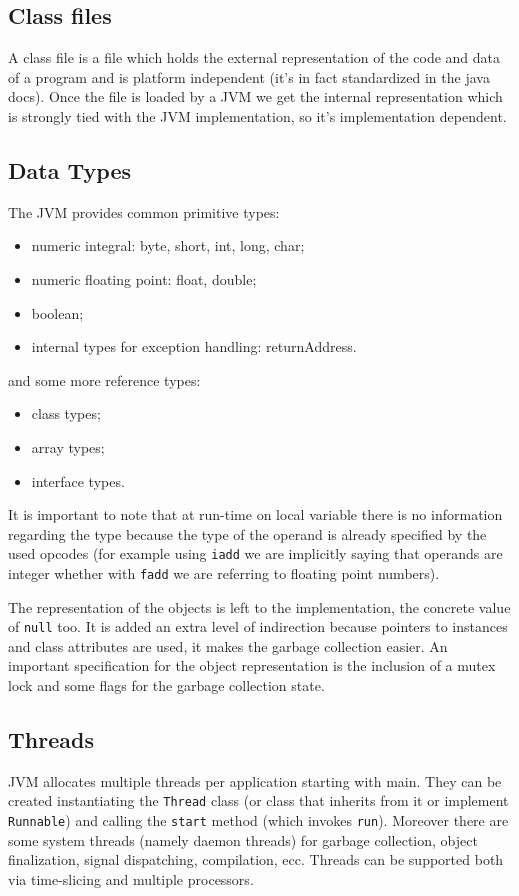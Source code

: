 \subsection{Class files}
A class file is a file which holds the external representation of the code and data of a program and is platform independent (it's in fact standardized in the java docs).
Once the file is loaded by a JVM we get the internal representation which is strongly tied with the JVM implementation, so it's implementation dependent.

\subsection{Data Types}
The JVM provides common primitive types:
\begin{itemize}
    \item numeric integral: byte, short, int, long, char;
    \item numeric floating point: float, double;
    \item boolean;
    \item internal types for exception handling: returnAddress.
\end{itemize}
and some more reference types:
\begin{itemize}
    \item class types;
    \item array types;
    \item interface types.
\end{itemize}

It is important to note that at run-time on local variable there is no information regarding the type because the type of the operand is already specified by the used opcodes (for example using \verb|iadd| we are implicitly saying that operands are integer whether with \verb|fadd| we are referring to floating point numbers).

The representation of the objects is left to the implementation, the concrete value of \verb|null| too.
It is added an extra level of indirection because pointers to instances and class attributes are used, it makes the garbage collection easier.
An important specification for the object representation is the inclusion of a mutex lock and some flags for the garbage collection state.

\subsection{Threads}
JVM allocates multiple threads per application starting with main.
They can be created instantiating the \verb|Thread| class (or class that inherits from it or implement \verb|Runnable|) and calling the \verb|start| method (which invokes \verb|run|).
Moreover there are some system threads (namely daemon threads) for garbage collection, object finalization, signal dispatching, compilation, ecc.
Threads can be supported both via time-slicing and multiple processors.

